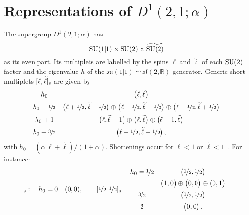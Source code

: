 \documentclass[a4paper, 11pt]{article}
\numberwithin{equation}{section}
\newcommand{\ts}[1]{\widetilde{#1}}
\newcommand{\+}{\oplus}
\begin{document}
\section{Representations of \texorpdfstring{$D^{1}(2,1;\alpha)$}{D(2,1,a)}} \label{app:d21a}
The supergroup $D^{1}(2,1;\alpha)$ has
\begin{equation}
	{\rm SU}(1\vert1)\times{\rm SU}(2)\times\ts{{\rm SU}(2)}
\end{equation}
as its even part. Its multiplets are labelled by the spins $\ell$ and $\ts{\ell}$ of each ${\rm SU}(2)$ factor and the eigenvalue $h$ of the $\mathfrak{su}(1\vert1)\simeq\mathfrak{sl}(2,\mathbb{R})$ generator. Generic short multiplets $[\ell,\ts{\ell}]_{\rm s}$ are given by~\cite{deBoer:1999gea,Eberhardt:2017fsi}
\begin{equation}
	\begin{array}{cc}
	 h_{0} & \big(\ell,\ts{\ell}\big) \\[5pt]
	 h_{0} + \nicefrac{1}{2} & \big(\ell+\nicefrac{1}{2},\ts{\ell}-\nicefrac{1}{2}\big) \oplus \big(\ell-\nicefrac{1}{2},\ts{\ell}-\nicefrac{1}{2}\big) \oplus \big(\ell-\nicefrac{1}{2},\ts{\ell}+\nicefrac{1}{2}\big) \\[5pt]
	 h_{0}+1 & \big(\ell,\ts{\ell}-1\big) \oplus \big(\ell,\ts{\ell}\big) \oplus \big(\ell-1,\ts{\ell}\big) \\[5pt]
	 h_{0} + \nicefrac{3}{2} & \big(\ell-\nicefrac{1}{2},\ts{\ell}-\nicefrac{1}{2}\big)\,,
	\end{array}
\end{equation}
with $h_{0}=(\alpha\,\ell+\ts{\ell})/(1+\alpha)$. Shortenings occur for $\ell<1$ or $\ts{\ell}<1$~\cite{deBoer:1999gea}. For instance:
\begin{equation}
	[0,0]_{\rm s}:\quad h_{0}=0 \quad (0,0),\qquad  [\nicefrac{1}{2},\nicefrac{1}{2}]_{\rm s}: \begin{array}{cc}
	 h_{0}=\nicefrac{1}{2} & \big(\nicefrac{1}{2},\nicefrac{1}{2}\big) \\[5pt]
	 1 & \big(1,0\big) \oplus \big(0,0\big) \oplus \big(0,1\big) \\[5pt]
	 \nicefrac{3}{2} & \big(\nicefrac{1}{2},\nicefrac{1}{2}\big) \\[5pt]
	 2 & \big(0,0\big)\,.
	\end{array}
\end{equation}
\end{document}
